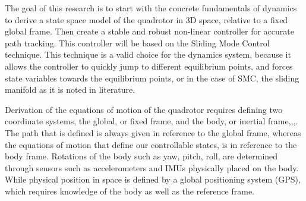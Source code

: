 \documentclass[9pt]{article}
\begin{document}
The goal of this research is to start with the concrete fundamentals of dynamics to derive a state space model of the quadrotor in 3D space, relative to a fixed global frame. Then create a stable and robust non-linear controller for accurate path tracking. This controller will be based on the Sliding Mode Control technique. This technique is a valid choice for the dynamics system, because it allows the controller to quickly jump to different equilibrium points, and forces state variables towards the equilibrium points, or in the case of SMC, the sliding manifold as it is noted in literature.

Derivation of the equations of motion of the quadrotor requires defining two coordinate systems, the global, or fixed frame, and the body, or inertial frame\cite{FanniMohamed2017AN6Q},\cite{FarameeVeeravat2014EotS},\cite{HaomiaoHuang2009Aaco},\cite{DenisKotarski2016CDFU}. The path that is defined is always given in reference to the global frame, whereas the equations of motion that define our controllable states, is in reference to the body frame. Rotations of the body such as yaw, pitch, roll, are determined through sensors such as accelerometers and IMUs physically placed on the body. While physical position in space is defined by a global positioning system (GPS), which requires knowledge of the body as well as the reference frame.


\end{document}
